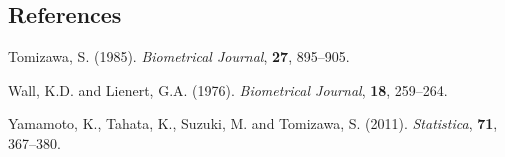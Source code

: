 \documentclass[12pt]{article}
\begin{document}
%        
%
%        

\subsection*{References}

\begin{description}

\item Tomizawa, S. (1985).
\textit{Biometrical Journal},
{\bf 27}, 895--905.

\item Wall, K.D. and Lienert, G.A. (1976).
\textit{Biometrical Journal},
{\bf 18}, 259--264.

\item Yamamoto, K., Tahata, K., Suzuki, M. and Tomizawa, S. (2011).
\textit{Statistica},
{\bf 71}, 367--380.


\end{description}
\end{document}
